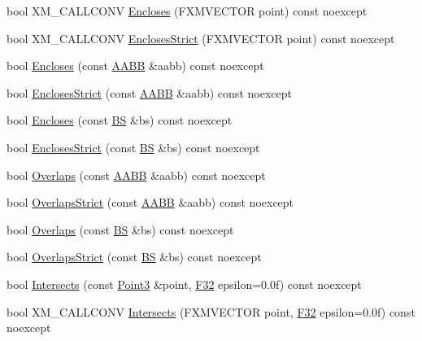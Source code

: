 \begin{DoxyCompactItemize}
bool X\+M\+\_\+\+C\+A\+L\+L\+C\+O\+NV \hyperlink{structmage_1_1_view_frustum_a94ad03cd84953b11722c5c3367e4b810}{Encloses} (F\+X\+M\+V\+E\+C\+T\+OR point) const noexcept
\item 
bool X\+M\+\_\+\+C\+A\+L\+L\+C\+O\+NV \hyperlink{structmage_1_1_view_frustum_ace8e8e4a91b34280fabf0bc879534ad2}{Encloses\+Strict} (F\+X\+M\+V\+E\+C\+T\+OR point) const noexcept
\item 
bool \hyperlink{structmage_1_1_view_frustum_ad9bffbf0a041452888559db4a4ed5f48}{Encloses} (const \hyperlink{structmage_1_1_a_a_b_b}{A\+A\+BB} \&aabb) const noexcept
\item 
bool \hyperlink{structmage_1_1_view_frustum_a7a0d293c4f3d1f29c54f45f00a7ca51f}{Encloses\+Strict} (const \hyperlink{structmage_1_1_a_a_b_b}{A\+A\+BB} \&aabb) const noexcept
\item 
bool \hyperlink{structmage_1_1_view_frustum_a779328d61928c60bfc0290d85eb79e4c}{Encloses} (const \hyperlink{structmage_1_1_b_s}{BS} \&bs) const noexcept
\item 
bool \hyperlink{structmage_1_1_view_frustum_a4300cf7690bc650ca521283496394997}{Encloses\+Strict} (const \hyperlink{structmage_1_1_b_s}{BS} \&bs) const noexcept
\item 
bool \hyperlink{structmage_1_1_view_frustum_a35c0afb66692cfd26a0e9bee2065892e}{Overlaps} (const \hyperlink{structmage_1_1_a_a_b_b}{A\+A\+BB} \&aabb) const noexcept
\item 
bool \hyperlink{structmage_1_1_view_frustum_a2eef224e458509eada25ec91a53753c6}{Overlaps\+Strict} (const \hyperlink{structmage_1_1_a_a_b_b}{A\+A\+BB} \&aabb) const noexcept
\item 
bool \hyperlink{structmage_1_1_view_frustum_ad7b492eaad1a93e650a8477045d5c0cb}{Overlaps} (const \hyperlink{structmage_1_1_b_s}{BS} \&bs) const noexcept
\item 
bool \hyperlink{structmage_1_1_view_frustum_a05963d6685c8cafc22be50c8e9b405df}{Overlaps\+Strict} (const \hyperlink{structmage_1_1_b_s}{BS} \&bs) const noexcept
\item 
bool \hyperlink{structmage_1_1_view_frustum_a7baa179995540134bced232579de7fc7}{Intersects} (const \hyperlink{structmage_1_1_point3}{Point3} \&point, \hyperlink{namespacemage_aa97e833b45f06d60a0a9c4fc22ae02c0}{F32} epsilon=0.\+0f) const noexcept
\item 
bool X\+M\+\_\+\+C\+A\+L\+L\+C\+O\+NV \hyperlink{structmage_1_1_view_frustum_a54f4654d834b3b01cd2cfdcd7a059dbf}{Intersects} (F\+X\+M\+V\+E\+C\+T\+OR point, \hyperlink{namespacemage_aa97e833b45f06d60a0a9c4fc22ae02c0}{F32} epsilon=0.\+0f) const noexcept

\end{DoxyCompactItemize}
